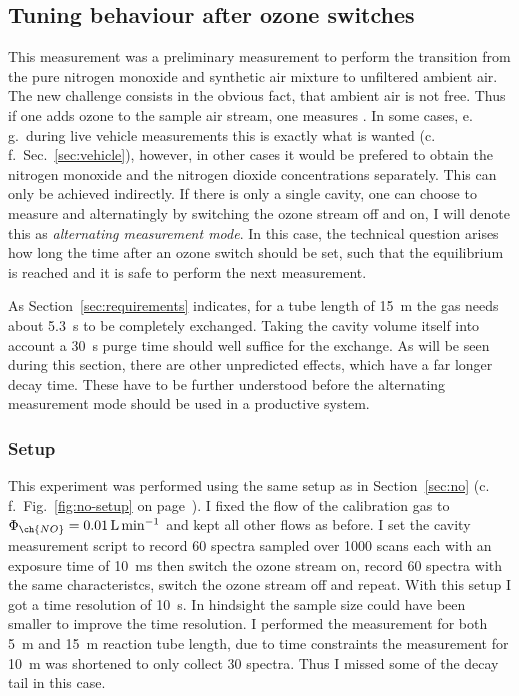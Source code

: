 \subsection{Tuning behaviour after ozone switches}
\label{sec:switch}

This measurement was a preliminary measurement to perform the
transition from the pure nitrogen monoxide and synthetic air mixture
to unfiltered ambient air. The new challenge consists in the obvious
fact, that ambient air is not  free. Thus if one adds ozone to
the sample air stream, one measures . In some
cases, e.\,g.\ during live vehicle measurements this is exactly what
is wanted (c.\,f.~Sec.~\ref{sec:vehicle}), however, in other cases it
would be prefered to obtain the nitrogen monoxide and the nitrogen
dioxide concentrations separately. This can only be achieved
indirectly. If there is only a single cavity, one can choose to
measure  and  alternatingly by switching the ozone
stream off and on, I will denote this as \emph{alternating
  measurement mode}. In this case, the technical question arises how
long the time after an ozone switch should be set, such that the
equilibrium is reached and it is safe to perform the next measurement.

As Section~\ref{sec:requirements} indicates, for a tube length of
\SI{15}{\meter} the gas needs about \SI{5.3}{\second} to be
completely exchanged. Taking the cavity volume itself into account a
\SI{30}{\second} purge time should well suffice for the exchange. As
will be seen during this section, there are other unpredicted effects,
which have a far longer decay time. These have to be further
understood before the alternating measurement mode should be used in a
productive system.

\subsubsection{Setup}
\label{sec:switch-setup}

This experiment was performed using the same setup as in
Section~\ref{sec:no} (c.\,f.\ Fig.~\ref{fig:no-setup} on
page~\pageref{fig:no-setup}). I fixed the flow of the 
calibration gas to $\Phi_{\ch{NO}} = \SI{0.01}{\liter\per\minute}$ and
kept all other flows as before. I set the cavity measurement script
to record 60 spectra sampled over 1000 scans each with an exposure
time of \SI{10}{\milli\second} then switch the ozone stream on, record
60 spectra with the same characteristcs, switch the ozone stream off
and repeat. With this setup I got a time resolution of
\SI{10}{\second}. In hindsight the sample size could have been
smaller to improve the time resolution. I performed the measurement
for both \SI{5}{\meter} and \SI{15}{\meter} reaction tube length, due
to time constraints the measurement for \SI{10}{\meter} was shortened
to only collect 30 spectra. Thus I missed some of the decay tail
in this case.

